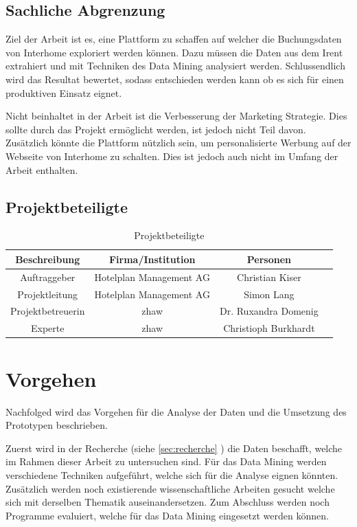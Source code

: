 \subsection{Sachliche Abgrenzung}
Ziel der Arbeit ist es, eine Plattform zu schaffen auf welcher die Buchungsdaten von Interhome exploriert werden können. Dazu müssen die Daten aus dem Irent extrahiert und mit Techniken des Data Mining analysiert werden. Schlussendlich wird das Resultat bewertet, sodass entschieden werden kann ob es sich für einen produktiven Einsatz eignet.

Nicht beinhaltet in der Arbeit ist die Verbesserung der Marketing Strategie. Dies sollte durch das Projekt ermöglicht werden, ist jedoch nicht Teil davon. Zusätzlich könnte die Plattform nützlich sein, um personalisierte Werbung auf der Webseite von Interhome zu schalten. Dies ist jedoch auch nicht im Umfang der Arbeit enthalten.

\subsection{Projektbeteiligte}
\begin{table}[H] 
	\caption{Projektbeteiligte}
	\centering
	
	\begin{tabular}{ | c | c | c | c |} 
		\hline 
		\rowcolor{tableheadcolor}
		\bfseries Beschreibung & 
		\bfseries Firma/Institution & 
		\bfseries Personen \\ \hline 
		Auftraggeber & Hotelplan Management AG & Christian Kiser \\ \hline 
		Projektleitung & Hotelplan Management AG & Simon Lang\\ \hline 
		Projektbetreuerin &  \gls{zhaw} & Dr. Ruxandra Domenig \\ \hline 
		Experte & \gls{zhaw} & Christioph Burkhardt \\ \hline 
	\end{tabular} 
\end{table}

\section{Vorgehen}
\label{sec:einletung:vorgehen}
Nachfolged wird das Vorgehen für die Analyse der Daten und die Umsetzung des Prototypen beschrieben.

Zuerst wird in der Recherche (siehe \cref{sec:recherche} ) die Daten beschafft, welche im Rahmen dieser Arbeit zu untersuchen sind. Für das Data Mining werden verschiedene Techniken aufgeführt, welche sich für die Analyse eignen könnten. Zusätzlich werden noch existierende wissenschaftliche Arbeiten gesucht welche sich mit derselben Thematik auseinandersetzen. Zum Abschluss werden noch Programme evaluiert, welche für das Data Mining eingesetzt werden können.

